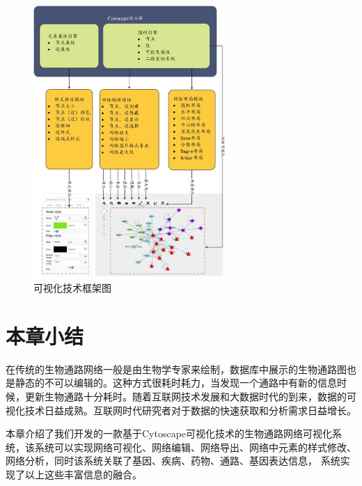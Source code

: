 \begin{figure}[h]
\centering
\includegraphics[width = 0.65\textwidth]{versioframework}
\caption[fig33]{可视化技术框架图}
\label{fig33}
\end{figure}

\section{本章小结}
在传统的生物通路网络一般是由生物学专家来绘制，数据库中展示的生物通路图也是静态的不可以编辑的。这种方式很耗时耗力，当发现一个通路中有新的信息时候，更新生物通路十分耗时。随着互联网技术发展和大数据时代的到来，数据的可视化技术日益成熟。互联网时代研究者对于数据的快速获取和分析需求日益增长。

本章介绍了我们开发的一款基于Cytoscape可视化技术的生物通路网络可视化系统，该系统可以实现网络可视化、网络编辑、网络导出、网络中元素的样式修改、网络分析，同时该系统关联了基因、疾病、药物、通路、基因表达信息， 系统实现了以上这些丰富信息的融合。
